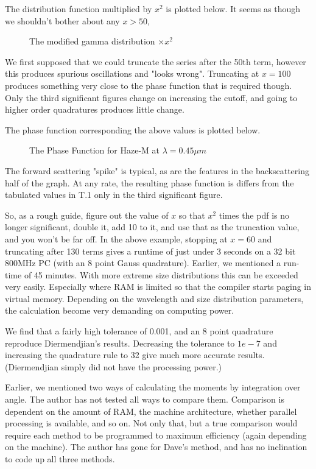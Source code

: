 \documentclass[12pt]{article}
\begin{document}
\begin{flushleft}
The distribution function multiplied by $x^2$ is plotted below. It seems
as though we shouldn't bother about any $x>50$, 
\vspace*{14cm}
\begin{figure}[htb]
\caption{ The modified gamma distribution $\times x^2$  }
\end{figure}

We first supposed that we could truncate the series after the 50th term,
 however this produces spurious oscillations and "looks wrong". Truncating 
at $x=100$ produces something very close to the phase function that is
required though. Only the third significant figures change on increasing
the cutoff, and going to higher order quadratures produces little change.

The phase function corresponding the above values is plotted below.
\vspace*{14cm}
\begin{figure}[htb]
\caption{The Phase Function for Haze-M at $\lambda=0.45 \mu m$ }
\end{figure}
The forward scattering "spike" is typical, as are the features in the backscattering
half of the graph. At any rate, the resulting phase function is differs
from the tabulated values in T.1 only in the third significant figure.

So, as a rough guide, figure out the value of $x$ so that $x^2$ times the pdf
is no longer significant, double it, add 10 to it, and use that as the truncation
 value, and you won't be far off. In the above example, stopping at $x=60$
 and truncating after 130 terms gives a runtime of just under 3 seconds
on a 32 bit 800MHz PC (with an 8 point Gauss quadrature). Earlier, we mentioned
a run-time of 45 minutes. With more extreme size distributions this can be exceeded very easily.
 Especially where RAM is limited so that the compiler starts paging in
virtual memory.
 Depending on the wavelength and size distribution parameters, the calculation
become very demanding on computing power.

We find that a fairly high tolerance of 0.001, and an 8 point quadrature reproduce
Diermendjian's results. Decreasing the tolerance to $1e-7$ and increasing the
quadrature rule to 32 give much more accurate results. (Diermendjian simply did not
have the processing power.) 

Earlier, we mentioned two ways of calculating the moments by integration over angle.
The author has not tested all ways to compare them. Comparison is dependent on the amount of RAM, the machine architecture, whether parallel processing is available, and so on. 
Not only that, but a true comparison would require each method to be programmed to maximum
efficiency (again depending on the machine). The author has gone for Dave's method, and
has no inclination to code up all three methods.


\end{flushleft}

\printbibliography
\end{document}
